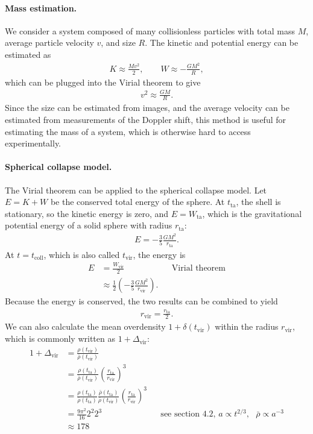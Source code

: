 \paragraph*{Mass estimation.}
We consider a system composed of many collisionless particles with total mass $M$, average particle velocity $v$, and size $R$.
The kinetic and potential energy can be estimated as
\begin{align*}
	K \approx \frac{M v^2}{2}, \qquad
	W \approx - \frac{G M^2}{R},
\end{align*}
which can be plugged into the Virial theorem to give
\begin{align*}
	v^2 \approx \frac{G M}{R}.
\end{align*}
Since the size can be estimated from images, and the average velocity can be estimated from measurements of the Doppler shift, this method is useful for estimating the mass of a system, which is otherwise hard to access experimentally. 


\paragraph*{Spherical collapse model.}
The Virial theorem can be applied to the spherical collapse model.
Let $E = K + W$ be the conserved total energy of the sphere.
At $t_\text{ta}$, the shell is stationary, so the kinetic energy is zero, and $E = W_\text{ta}$, which is the gravitational potential energy of a solid sphere with radius $r_\text{ta}$:
\begin{align*}
	E = - \frac{3}{5} \frac{G M^2}{r_\text{ta}}.
\end{align*}
At $t = t_\text{coll}$, which is also called $t_\text{vir}$, the energy is
\begin{align*}
	E
	&= \frac{W_\text{vir}}{2}
	&&\text{Virial theorem}\\
	&\approx \frac{1}{2}\left( - \frac{3}{5} \frac{GM^2}{r_\text{vir}} \right).
\end{align*}
Because the energy is conserved, the two results can be combined to yield
\begin{align*}
	r_\text{vir} = \frac{r_\text{ta}}{2}.
\end{align*}
We can also calculate the mean overdensity $1 + \delta(t_\text{vir})$ within the radius $r_\text{vir}$, which is commonly written as $1 + \Delta_\text{vir}$:
\begin{align*}
	1 + \Delta_\text{vir}
	&= \frac{\rho(t_\text{vir})}{\bar{\rho}(t_\text{vir})}\\
	&= \frac{ \rho(t_\text{ta})}{\bar{\rho}(t_\text{vir})}
	\left(\frac{r_\text{ta}}{r_\text{vir}}\right)^3\\
	&= \frac{\rho(t_\text{ta})}{\bar{\rho}(t_\text{ta})}
	\frac{\bar{\rho}(t_\text{ta})}{\bar{\rho}(t_\text{vir})}
	\left( \frac{r_\text{ta}}{r_\text{vir}} \right)^3\\
	&= \frac{9\pi^2}{16}   2^2 2^3
	&&\text{see section 4.2, } a \propto t^{2/3}, \text{ } \bar{\rho} \propto a^{-3}\\
	&\approx 178
\end{align*}

